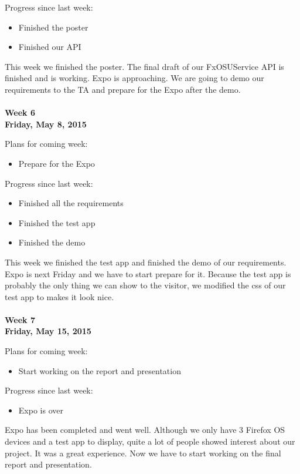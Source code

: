 \noindent Progress since last week:
\begin{itemize}
\item Finished the poster
\item Finished our API
\end{itemize}

\noindent This week we finished the poster. The final draft of our FxOSUService API is finished and is working. Expo is approaching. We are going to demo our requirements to the TA and prepare for the Expo after the demo. \\
\\
\textbf{Week 6\\Friday, May 8, 2015\\}

\noindent Plans for coming week:
\begin{itemize}
\item Prepare for the Expo
\end{itemize}

\noindent Progress since last week:
\begin{itemize}
\item Finished all the requirements
\item Finished the test app
\item Finished the demo
\end{itemize}

\noindent This week we finished the test app and finished the demo of our requirements. Expo is next Friday and we have to start prepare for it. Because the test app is probably the only thing we can show to the visitor, we modified the css of our test app to makes it look nice. \\
\\
\textbf{Week 7\\Friday, May 15, 2015\\}

\noindent Plans for coming week:
\begin{itemize}
\item Start working on the report and presentation
\end{itemize}

\noindent Progress since last week:
\begin{itemize}
\item Expo is over
\end{itemize}

\noindent Expo has been completed and went well. Although we only have 3 Firefox OS devices and a test app to display, quite a lot of people showed interest about our project. It was a great experience. Now we have to start working on the final report and presentation. \\
